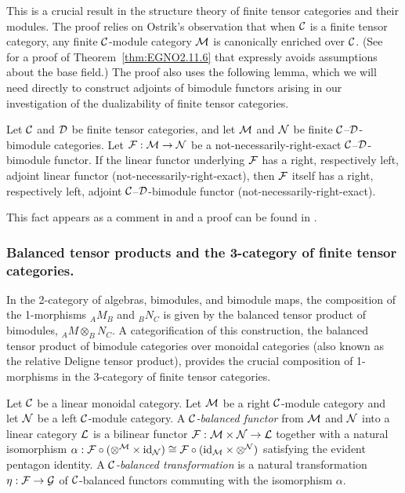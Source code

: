 \documentclass{amsart}
\begin{document}
\nid This is a crucial result in the structure theory of finite tensor categories and their modules.  The proof relies on Ostrik's observation \cite{MR1976459, EO-ftc} that when $\mathcal C$ is a finite tensor category, any finite $\mathcal C$-module category $\mathcal M$ is canonically enriched over $\mathcal C$.  (See~\cite{BTP} for a proof of Theorem~\ref{thm:EGNO2.11.6} that expressly avoids assumptions about the base field.)  The proof also uses the following lemma, which we will need directly to construct adjoints of bimodule functors arising in our investigation of the dualizability of finite tensor categories.

\begin{lemma} \label{lma:module-adjoint}
Let $\mathcal C$ and $\mathcal D$ be finite tensor categories, and let $\mathcal M$ and $\mathcal N$ be finite $\mathcal C$--$\mathcal D$-bimodule categories.  Let $\mathcal F: \mathcal M \to \mathcal N$ be a not-necessarily-right-exact $\mathcal C$--$\mathcal D$-bimodule functor.  If the linear functor underlying $\mathcal F$ has a right, respectively left, adjoint linear functor (not-necessarily-right-exact), then $\mathcal F$ itself has a right, respectively left, adjoint $\mathcal C$--$\mathcal D$-bimodule functor (not-necessarily-right-exact).
\end{lemma}


\nid This fact appears as a comment in \cite{EO-ftc} and a proof can be found in \cite{BTP}.

\subsubsection{Balanced tensor products and the 3-category of finite tensor categories.}

In the 2-category of algebras, bimodules, and bimodule maps, the composition of the 1-morphisms $_A M_B$ and $_B N_C$ is given by the balanced tensor product of bimodules, $_A M \otimes_B N_C$.  A categorification of this construction, the balanced tensor product of bimodule categories over monoidal categories (also known as the relative Deligne tensor product), provides the crucial composition of 1-morphisms in the 3-category of finite tensor categories.

\begin{definition}
	Let $\mathcal C$ be a linear monoidal category. 
	Let $\mathcal M$ be a right $\mathcal C$-module category and let $\mathcal N$ be a left $\mathcal C$-module category. A {\em $\mathcal C$-balanced functor} from $\mathcal M$ and $\mathcal N$ into a linear category $\mathcal L$ is a bilinear functor $\mathcal F: \mathcal M \times \mathcal N \to \mathcal L$ together with a natural isomorphism $\alpha: \mathcal F \circ (\otimes^{\mathcal M} \times \mathrm{id}_{\mathcal N}) \cong \mathcal F \circ (\mathrm{id}_{\mathcal M} \times \otimes^{\mathcal N})$ satisfying the evident pentagon identity. A {\em $\mathcal C$-balanced transformation} is a natural transformation $\eta:\mathcal F \to \mathcal G$ of $\mathcal C$-balanced functors commuting with the isomorphism $\alpha$.
\end{definition}
\end{document}
